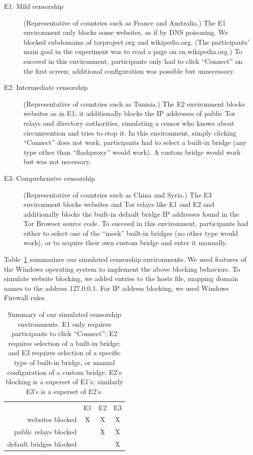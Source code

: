 \documentclass[USenglish,oneside,twocolumn]{article}
\begin{document}
\begin{description}
\item[E1: Mild censorship]
(Representative of countries such as France and Australia.)
The E1 environment only blocks some websites,
as if by DNS poisoning.
We blocked subdomains of torproject.org
and wikipedia.org.
(The participants' main goal in the experiment was to read a page on en.wikipedia.org.)
To succeed in this environment,
participants only had to click ``Connect'' on the first screen;
additional configuration was possible but unnecessary.

\item[E2: Intermediate censorship]
(Representative of countries such as Tunisia.)
The E2 environment blocks websites as in E1;
it additionally blocks the IP addresses of public Tor relays
and directory authorities, simulating a censor who knows
about circumvention and tries to stop it.
In this environment, simply clicking ``Connect'' does not work;
participants had to select a built-in bridge
(any type other than ``flashproxy'' would work).
A custom bridge would work but was not necessary.

\item[E3: Comprehensive censorship]
(Representative of countries such as China and Syria.)
The E3 environment blocks websites and Tor relays like E1 and E2
and additionally blocks the built-in default bridge IP addresses
found in the Tor Browser source code.
To succeed in this environment, participants had either to select
one of the ``meek'' built-in bridges (no other type would work),
or to acquire their own custom bridge and enter it manually.
\end{description}

\smallskip

Table~\ref{tab:environments} summarizes our simulated censorship
environments. We used features of the Windows operating system 
to implement the above blocking behaviors.
To simulate website blocking, we added entries to the hosts file,
mapping domain names to the address 127.0.0.1.
For IP address blocking, we used Windows Firewall rules.

\begin{table}
\centering
\begin{tabular}{r c c c}
& E1 & E2 & E3 \\
websites blocked & X & X & X \\
public relays blocked & & X & X \\
default bridges blocked & & & X \\
\end{tabular}
\caption{
Summary of our simulated censorship environments.
E1 only requires participants to click ``Connect'';
E2 requires selection of a built-in bridge;
and E3 requires selection of a specific type of built-in bridge,
or manual configuration of a custom bridge.
E2's blocking is a superset of E1's;
similarly E3's is a superset of E2's.
}
\label{tab:environments}
\end{table}
\end{document}
